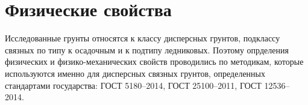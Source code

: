 %
%
%
%
%
%
%
%
%
%
%
%

\section{Физические свойства}\label{sec:ch6/sec3}

Исследованные грунты относятся к классу дисперсных грунтов, подклассу связных по типу 
к осадочным и к подтипу ледниковых. 
Поэтому опрделения физических и физико-механических свойств проводились по методикам, 
которые используются именно для дисперсных связных грунтов, определенных 
стандартами государства: ГОСТ 5180--2014, ГОСТ 25100--2011, ГОСТ 12536--2014.

